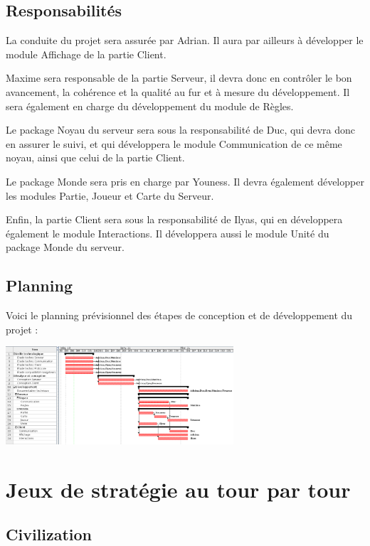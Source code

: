 \documentclass[a4paper,10pt]{report}
\begin{document}
    \section{Responsabilités}

      La conduite du projet sera assurée par Adrian. Il aura par ailleurs à développer le module Affichage de la partie Client. 

      Maxime sera responsable de la partie Serveur, il devra donc en contrôler le bon avancement, la cohérence et la qualité au fur et à mesure du développement. Il sera également en charge du développement du module de Règles. 

      Le package Noyau du serveur sera sous la responsabilité de Duc, qui devra donc en assurer le suivi, et qui développera le module Communication de ce même noyau, ainsi que celui de la partie Client. 

      Le package Monde sera pris en charge par Youness. Il devra également développer les modules Partie, Joueur et Carte du Serveur. 

      Enfin, la partie Client sera sous la responsabilité de Ilyas, qui en développera également le module Interactions. Il développera aussi le module Unité du package Monde du serveur. 


    \section{Planning}

      Voici le planning prévisionnel des étapes de conception et de développement du projet : 
      
      \includegraphics[width=320px]{img/planning.png}


\appendix

\chapter{Jeux de stratégie au tour par tour}

	\section{Civilization}
\end{document}
